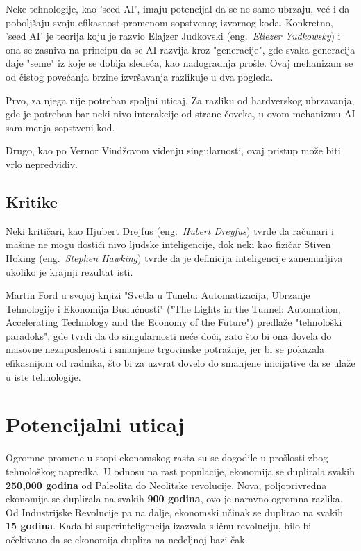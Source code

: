 \documentclass[a4paper]{article}
\begin{document}
Neke tehnologije, kao 'seed AI', imaju potencijal da se ne samo ubrzaju, već i da poboljšaju svoju efikasnost promenom sopstvenog izvornog koda. Konkretno, 'seed AI' je teorija koju je razvio Elajzer Judkovski (eng.~{\em Eliezer Yudkowsky}) i ona se zasniva na principu da se AI razvija kroz "generacije", gde svaka generacija daje "seme" iz koje se dobija sledeća, kao nadogradnja prošle.
Ovaj mehanizam se od čistog povećanja brzine izvršavanja razlikuje u dva pogleda.

Prvo, za njega nije potreban spoljni uticaj. Za razliku od hardverskog ubrzavanja, gde je potreban bar neki nivo interakcije od strane čoveka, u ovom mehanizmu AI sam menja sopstveni kod.

Drugo, kao po Vernor Vindžovom viđenju singularnosti, ovaj pristup može biti vrlo nepredvidiv. \cite{mog-8}

\subsection{Kritike}

Neki kritičari, kao Hjubert Drejfus (eng.~{\em Hubert Dreyfus}) tvrde da računari i mašine ne mogu dostići nivo ljudske inteligencije, dok neki kao fizičar Stiven Hoking (eng.~{\em Stephen Hawking}) tvrde da je definicija inteligencije zanemarljiva ukoliko je krajnji rezultat isti. 

Martin Ford u svojoj knjizi "Svetla u Tunelu: Automatizacija, Ubrzanje Tehnologije i Ekonomija Budućnosti" ("The Lights in the Tunnel: Automation, Accelerating Technology and the Economy of the Future") predlaže "tehnološki paradoks", gde tvrdi da do singularnosti neće doći, zato što bi ona dovela do masovne nezaposlenosti i smanjene trgovinske potražnje, jer bi se pokazala efikasnijom od radnika, što bi za uzvrat dovelo do smanjene inicijative da se ulaže u iste tehnologije. \cite{mog-10}

\section{Potencijalni uticaj}
\label{sec:potencijalni_uticaj}
\hfill

Ogromne promene u stopi ekonomskog rasta su se dogodile u prošlosti zbog tehnološkog napredka. U odnosu na rast populacije, ekonomija se duplirala svakih \textbf{250,000 godina} od Paleolita do Neolitske revolucije. Nova, poljoprivredna ekonomija se duplirala na svakih \textbf{900 godina}, ovo je naravno ogromna razlika. Od Industrijske Revolucije pa na dalje, ekonomski učinak se duplirao na svakih \textbf{15 godina}. Kada bi superinteligencija izazvala sličnu revoluciju, bilo bi očekivano da se ekonomija duplira na nedeljnoj bazi čak.
\end{document}
